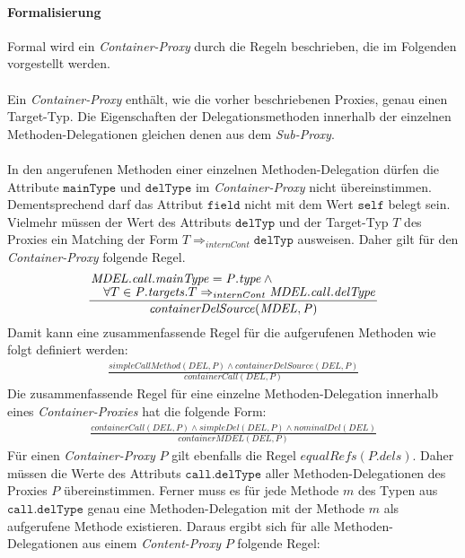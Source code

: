 \documentclass[a4paper,12pt]{article}
\begin{document}
\paragraph{Formalisierung}
Formal wird ein \emph{Container-Proxy} durch die Regeln beschrieben, die im Folgenden vorgestellt werden.\\\\
Ein \emph{Container-Proxy} enthält, wie die vorher beschriebenen Proxies, genau einen Target-Typ. Die Eigenschaften der Delegationsmethoden innerhalb der einzelnen Methoden-Delegationen gleichen denen aus dem \emph{Sub-Proxy}.\\\\
In den angerufenen Methoden einer einzelnen Methoden-Delegation dürfen die Attribute $\texttt{mainType}$ und $\texttt{delType}$ im \emph{Container-Proxy} nicht übereinstimmen. Dementsprechend darf das Attribut $\texttt{field}$ nicht mit dem Wert $\texttt{self}$ belegt sein. Vielmehr müssen der Wert des Attributs $\texttt{delTyp}$ und der Target-Typ $T$ des Proxies ein Matching der Form $T \Rightarrow_{internCont} \texttt{delTyp}$ ausweisen. Daher gilt für den \emph{Container-Proxy} folgende Regel.
\begin{gather*}
\frac{\splitfrac{\mathit{MDEL.call.mainType} = \mathit{P.type} \wedge \mathit{ }}
{ \forall T \in \mathit{P.targets}. T \Rightarrow_{internCont} \mathit{MDEL.call.delType}}
}
{\mathit{containerDelSource(MDEL,P)}}
\end{gather*}
\noindent
Damit kann eine zusammenfassende Regel für die aufgerufenen Methoden wie folgt definiert werden:
\begin{gather*}
\frac{\mathit{simpleCallMethod(DEL,P)} \wedge \mathit{containerDelSource(DEL,P)}}
{\mathit{containerCall(DEL,P)}}
\end{gather*}
Die zusammenfassende Regel für eine einzelne Methoden-Delegation innerhalb eines \emph{Container-Proxies} hat die folgende Form:
\begin{gather*}
\frac{\mathit{containerCall(DEL,P)} \wedge \mathit{simpleDel(DEL,P) \wedge \mathit{nominalDel(DEL)}}}
{\mathit{containerMDEL(DEL,P)}}
\end{gather*}
Für einen \emph{Container-Proxy} $P$ gilt ebenfalls die Regel $\mathit{equalRefs(P.dels)}$. Daher müssen die Werte des Attributs $\texttt{call.delType}$ aller Methoden-Delegationen des Proxies $P$ übereinstimmen. Ferner muss es für jede Methode $m$ des Typen aus $\texttt{call.delType}$ genau eine Methoden-Delegation mit der Methode $m$ als aufgerufene Methode existieren. Daraus ergibt sich für alle Methoden-Delegationen aus einem \emph{Content-Proxy} $P$ folgende Regel:
\end{document}
